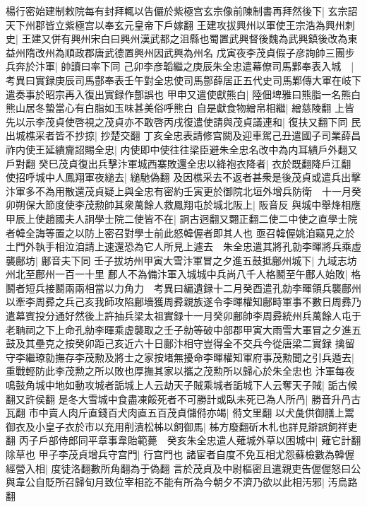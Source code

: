 楊行密始建制敕院每有封拜輒以告儼於紫極宫玄宗像前陳制書再拜然後下|{
	玄宗詔天下州郡皆立紫極宫以奉玄元皇帝下戶嫁翻}
王建攻拔興州以軍使王宗浩為興州刺史|{
	王建又併有興州宋白曰興州漢武都之沮縣也蜀置武興督後魏為武興鎮後改為東益州隋改州為順政郡唐武德置興州因武興為州名}
戊寅夜李茂貞假子彦詢帥三團步兵奔於汴軍|{
	帥讀曰率下同}
己卯李彦韜繼之庚辰朱全忠遣幕僚司馬鄴奉表入城　|{
	考異曰實録庚辰司馬鄷奉表壬午對全忠使司馬鄷薛居正五代史司馬鄴傳大軍在岐下遣奏事於昭宗再入復出實録作鄷誤也}
甲申又遣使獻熊白|{
	陸佃埤雅曰熊脂一名熊白熊山居冬蟄當心有白脂如玉味甚美俗呼熊白}
自是獻食物繒帛相繼|{
	繒慈陵翻}
上皆先以示李茂貞使啓視之茂貞亦不敢啓丙戌復遣使請與茂貞議連和|{
	復扶又翻下同}
民出城樵采者皆不抄掠|{
	抄楚交翻}
丁亥全忠表請修宫闕及迎車駕己丑遣國子司業薛昌祚内使王延繢齎詔賜全忠|{
	内使即中使往往梁臣避朱全忠名改中為内耳繢戶外翻又戶對翻}
癸巳茂貞復出兵擊汴軍城西寨敗還全忠以絳袍衣降者|{
	衣於既翻降戶江翻}
使招呼城中人鳳翔軍夜縋去|{
	縋馳偽翻}
及因樵采去不返者甚衆是後茂貞或遣兵出擊汴軍多不為用散還茂貞疑上與全忠有密約壬寅更於御院北垣外增兵防衛　十一月癸卯朔保大節度使李茂勲帥其衆萬餘人救鳳翔屯於城北阪上|{
	阪音反}
與城中舉烽相應　甲辰上使趙國夫人詗學士院二使皆不在|{
	詗古迥翻又翾正翻二使二中使之直學士院者韓全誨等置之以防上密召對學士前此怒韓偓者即其人也}
亟召韓偓姚洎竊見之於土門外執手相泣洎請上速還恐為它人所見上遽去　朱全忠遣其將孔勍李暉將兵乘虛襲鄜坊|{
	鄜音夫下同}
壬子拔坊州甲寅大雪汴軍冒之夕進五鼓抵鄜州城下|{
	九域志坊州北至鄜州一百一十里}
鄜人不為備汴軍入城城中兵尚八千人格鬭至午鄜人始敗|{
	格鬭者短兵接鬭兩兩相當以力角力　考異曰編遺録十二月癸酉遣孔勍李暉領兵襲鄜州以牽李周彛之兵己亥我師攻陷鄜墻獲周彛親族遂令李暉權知鄜畤軍事不數日周彞乃遣幕賓投分通好然後上許抽兵梁太祖實録十一月癸卯鄜帥李周彛統州兵萬餘人屯于老聃祠之下上命孔勍李暉乘虚襲取之壬子勍等破中部郡甲寅大雨雪大軍冒之夕進五鼓及其壘克之按癸卯距己亥近六十日鄜汴相守豈得全不交兵今從唐梁二實録}
擒留守李繼璙勍撫存李茂勲及將士之家按堵無擾命李暉權知軍府事茂勲聞之引兵遁去|{
	重戰輕防此李茂勲之所以敗也厚撫其家以攜之茂勲所以歸心於朱全忠也}
汴軍每夜鳴鼓角城中地如動攻城者詬城上人云劫天子賊乘城者詬城下人云奪天子賊|{
	詬古候翻又許侯翻}
是冬大雪城中食盡凍餒死者不可勝計或臥未死已為人所冎|{
	勝音升冎古瓦翻}
市中賣人肉斤直錢百犬肉直五百茂貞儲偫亦竭|{
	偫文里翻}
以犬彘供御膳上鬻御衣及小皇子衣於市以充用削漬松柹以飼御馬|{
	柹方廢翻斫木札也詳見辯誤飼祥吏翻}
丙子戶部侍郎同平章事韋貽範薨　癸亥朱全忠遣人薙城外草以困城中|{
	薙它計翻除草也}
甲子李茂貞增兵守宫門|{
	行宫門也}
諸宦者自度不免互相尤怨蘇檢數為韓偓經營入相|{
	度徒洛翻數所角翻為于偽翻}
言於茂貞及中尉樞密且遣親吏告偓偓怒曰公與韋公自貶所召歸旬月致位宰相訖不能有所為今朝夕不濟乃欲以此相汚邪|{
	汚烏路翻}
